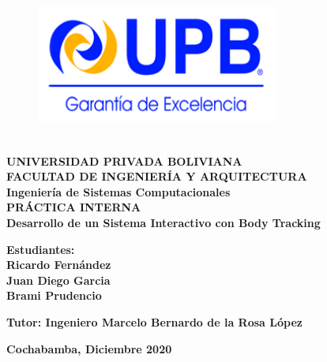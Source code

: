 \begin{titlepage}
	\makeatletter
	\setlength{\@fptop}{0pt}
	\makeatother
\begin{figure}[t!]
	\centering
	\includegraphics[width=8cm,height=5cm,]{./Images/Logo_Upb.png}
\end{figure}
\begin{center}
	\textbf{
		\large{UNIVERSIDAD PRIVADA BOLIVIANA\\
		FACULTAD DE INGENIERÍA Y ARQUITECTURA\\
		Ingeniería de Sistemas Computacionales\\[1cm]}
		\huge{PRÁCTICA INTERNA}\\[1cm]
		\Huge{Desarrollo de un Sistema Interactivo con Body Tracking}
	}\\[1cm]
\end{center} 
\textbf{Estudiantes: \\}
\textbf{
		Ricardo Fernández\\
		Juan Diego Garcia\\
		Brami Prudencio\\
	}
\begin{center}
		\textbf{
		Tutor:
		Ingeniero Marcelo Bernardo de la Rosa López\\[2cm]
	}
\end{center} 
	\begin{center}
		\textbf{Cochabamba, Diciembre 2020}
	\end{center}

\end{titlepage}